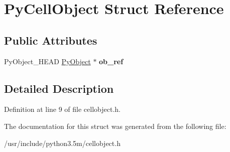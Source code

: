 \hypertarget{structPyCellObject}{}\section{Py\+Cell\+Object Struct Reference}
\label{structPyCellObject}
\subsection*{Public Attributes}
\begin{DoxyCompactItemize}
\item 
Py\+Object\+\_\+\+H\+E\+AD \hyperlink{struct__object}{Py\+Object} $\ast$ {\bfseries ob\+\_\+ref}\hypertarget{structPyCellObject_a8801f944d71f980fbb18f94562ab38a1}{}\label{structPyCellObject_a8801f944d71f980fbb18f94562ab38a1}

\end{DoxyCompactItemize}


\subsection{Detailed Description}


Definition at line 9 of file cellobject.\+h.



The documentation for this struct was generated from the following file\+:\begin{DoxyCompactItemize}
\item 
/usr/include/python3.\+5m/cellobject.\+h\end{DoxyCompactItemize}
